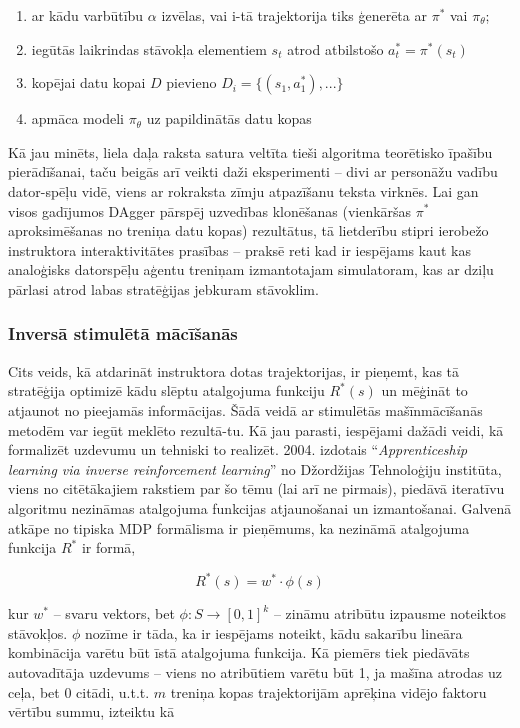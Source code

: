\documentclass[12pt, a4paper]{article}
\numberwithin{equation}{section} %
\begin{document}
\begin{enumerate}
    \item ar kādu varbūtību $\alpha$ izvēlas, vai i-tā trajektorija tiks ģenerēta ar $\pi^*$ vai $\pi_{\theta}$;
    \item iegūtās laikrindas stāvokļa elementiem $s_t$ atrod atbilstošo $a^*_t=\pi^*(s_t)$ 
    \item kopējai datu kopai $D$ pievieno $D_i=\lbrace (s_1, a^*_1),... \rbrace$
    \item apmāca modeli $\pi_{\theta}$ uz papildinātās datu kopas
\end{enumerate}

Kā jau minēts, liela daļa raksta satura veltīta tieši algoritma teorētisko īpašību pierādīšanai, taču beigās arī veikti daži eksperimenti -- divi ar personāžu vadību dator-spēļu vidē, viens ar rokraksta zīmju atpazīšanu teksta virknēs. Lai gan visos gadījumos DAgger pārspēj uzvedības klonēšanas (vienkāršas $\pi^*$ aproksimēšanas no treniņa datu kopas) rezultātus, tā lietderību stipri ierobežo instruktora interaktivitātes prasības -- praksē reti kad ir iespējams kaut kas analoģisks datorspēļu aģentu treniņam izmantotajam simulatoram, kas ar dziļu pārlasi atrod labas stratēģijas jebkuram stāvoklim.

\subsubsection{Inversā stimulētā mācīšanās}

Cits veids, kā atdarināt instruktora dotas trajektorijas, ir pieņemt, kas tā stratēģija optimizē kādu slēptu atalgojuma funkciju $R^*(s)$ un mēģināt to atjaunot no pieejamās informācijas. Šādā veidā ar stimulētās mašīnmācīšanās metodēm var iegūt meklēto rezultā-tu. Kā jau parasti, iespējami dažādi veidi, kā formalizēt uzdevumu un tehniski to realizēt. 2004. izdotais ``\textit{Apprenticeship learning via inverse reinforcement learning}'' \cite{abbeel2004apprenticeship} no Džordžijas Tehnoloģiju institūta, viens no citētākajiem rakstiem par šo tēmu (lai arī ne pirmais), piedāvā iteratīvu algoritmu nezināmas atalgojuma funkcijas atjaunošanai un izmantošanai. Galvenā atkāpe no tipiska MDP formālisma ir pieņēmums, ka nezināmā atalgojuma funkcija $R^*$ ir formā, 

\begin{equation}
    R^*(s) = w^* \cdot \phi(s)
\end{equation}

kur $w^*$ -- svaru vektors, bet $\phi: S \rightarrow [0,1]^k$ -- zināmu atribūtu izpausme noteiktos stāvokļos. $\phi$ nozīme ir tāda, ka ir iespējams noteikt, kādu sakarību lineāra kombinācija varētu būt īstā atalgojuma funkcija. Kā piemērs tiek piedāvāts autovadītāja uzdevums -- viens no atribūtiem varētu būt 1, ja mašīna atrodas uz ceļa, bet 0 citādi, u.t.t. $m$ treniņa kopas trajektorijām aprēķina vidējo faktoru vērtību summu, izteiktu kā
\end{document}
